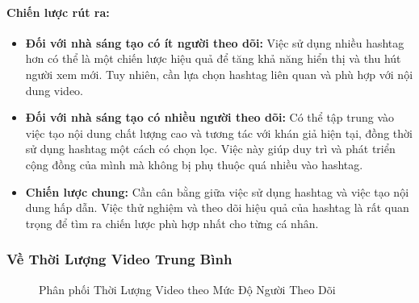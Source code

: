 \paragraph{Chiến lược rút ra:}
\begin{itemize}
    \item \textbf{Đối với nhà sáng tạo có ít người theo dõi:} Việc sử dụng nhiều hashtag hơn có thể là một chiến lược hiệu quả để tăng khả năng hiển thị và thu hút người xem mới. Tuy nhiên, cần lựa chọn hashtag liên quan và phù hợp với nội dung video.
    
    \item \textbf{Đối với nhà sáng tạo có nhiều người theo dõi:} Có thể tập trung vào việc tạo nội dung chất lượng cao và tương tác với khán giả hiện tại, đồng thời sử dụng hashtag một cách có chọn lọc. Việc này giúp duy trì và phát triển cộng đồng của mình mà không bị phụ thuộc quá nhiều vào hashtag.
    
    \item \textbf{Chiến lược chung:} Cần cân bằng giữa việc sử dụng hashtag và việc tạo nội dung hấp dẫn. Việc thử nghiệm và theo dõi hiệu quả của hashtag là rất quan trọng để tìm ra chiến lược phù hợp nhất cho từng cá nhân.
\end{itemize}

\subsubsection{Về Thời Lượng Video Trung Bình}

\begin{figure}[H]
    \centering
    \caption{Phân phối Thời Lượng Video theo Mức Độ Người Theo Dõi}
    \label{fig:thoi_luong_phan_phoi}
\end{figure}

